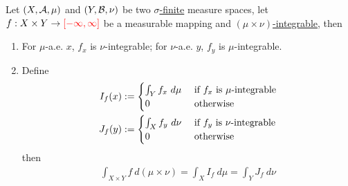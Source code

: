 \documentclass[11pt]{article}
\newcommand{\dmu}[0]{\ d\mu}
\begin{document}
	\begin{theorem}
		Let $(X, \mathcal{{A}}, \mu)$ and $(Y, \mathcal{{B}}, \nu)$ be two \ul{$\sigma$-finite} measure spaces, let $f: X \times Y \to \textcolor{red}{[-\infty, \infty]}$ be a measurable mapping and \ul{$(\mu \times \nu)$-integrable}, then
		\begin{enumerate}
			\item For $\mu$-a.e. $x$, $f_x$ is $\nu$-integrable; for $\nu$-a.e. $y$, $f_y$ is $\mu$-integrable.
			\item Define
			\begin{align}
				I_f(x) &:= \begin{cases}
					\int_Y f_x\dmu &\tx{ if $f_x$ is $\mu$-integrable} \\
					0 &\tx{ otherwise}
				\end{cases} \\
				J_f(y) &:= \begin{cases}
					\int_X f_y\ d\nu &\tx{ if $f_y$ is $\nu$-integrable} \\
					0 &\tx{ otherwise}
				\end{cases}
			\end{align}
			then
			\begin{align}
				\int_{X \times Y} f\ d(\mu \times \nu) = \int_X I_f\dmu = \int_Y J_f\ d\nu
			\end{align}
		\end{enumerate}
	\end{theorem}
\end{document}
